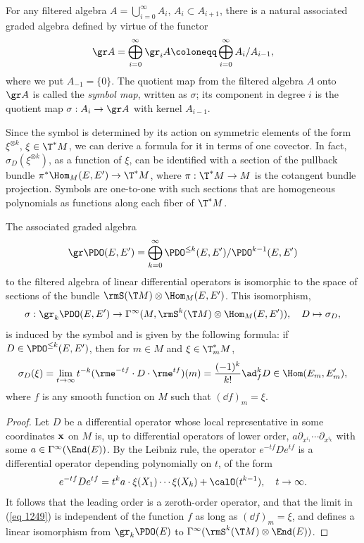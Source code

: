 \begin{defn}
    For any filtered algebra $A=\bigcup_{i=0}^\infty A_i$, $A_i\subset A_{i+1}$, there is a natural associated graded algebra defined by virtue of the functor 
    \[\gr A= \bigoplus_{i=0}^\infty \gr_i A\coloneqq \bigoplus_{i=0}^\infty A_i\slash A_{i-1},\]
    where we put $A_{-1}=\{0\}$. The quotient map from the filtered algebra $A$ onto $\gr A$ is called the \emph{symbol map}, written as $\sigma$; its component in degree $i$ is the quotient map $\sigma:A_i\to \gr A$ with kernel $A_{i-1}$.
\end{defn}

Since the symbol is determined by its action on symmetric elements of the form $\xi^{\otimes k}$, $\xi\in \T^\ast M$, we can derive a formula for it in terms of one covector. In fact, $\sigma_D(\xi^{\otimes k})$, as a function of $\xi$, can be identified with a section of the pullback bundle $\pi^\ast \Hom_M(E,E')\to \T^\ast M$, where $\pi:\T^\ast M\to M$ is the cotangent bundle projection. Symbols are one-to-one with such sections that are homogeneous polynomials as functions along each fiber of $\T^\ast M$.

\begin{prop}
    The associated graded algebra 
    \[\gr\PDO(E,E')=\bigoplus_{k=0}^{\infty}\PDO^{\leq k}(E,E')\slash\PDO^{k-1}(E,E')\]
    to the filtered algebra of linear differential operators is isomorphic to the space of sections of the bundle $\rmS(\T M)\otimes\Hom_M(E,E')$. This isomorphism,
    \[\sigma:\gr_k\PDO(E,E')\to \Gamma^\infty(M,\rmS^k(\T M)\otimes\Hom_M(E,E')),\quad D\mapsto \sigma_D,\] 
    is induced by the symbol and is given by the following formula: if $D\in\PDO^{\leq k}(E,E')$, then for $m\in M$ and $\xi\in \T^\ast_m M$,
    \[\sigma_D(\xi)=\lim_{t\to\infty}t^{-k}(\rme^{-tf}\cdot D\cdot \rme^{tf})(m)=\frac{(-1)^k}{k!}\ad_f^k D\in\Hom(E_m,E_m'),\label{eq 1249}\]
    where $f$ is any smooth function on $M$ such that $(\dd f)_m=\xi$.
\end{prop}
\begin{proof}
    Let $D$ be a differential operator whose local representative in some coordinates $\bf{x}$ on $M$ is, up to differential operators of lower order, $a \partial_{x^{i_1}}\cdots\partial_{x^{i_k}}$ with some $a\in\Gamma^\infty(\End(E))$. By the Leibniz rule, the operator $e^{-tf}De^{tf}$ is a differential operator depending polynomially on $t$, of the form 
    \[e^{-tf}De^{tf}=t^k a\cdot \xi(X_1)\cdots \xi(X_k)+\calO(t^{k-1}),\quad t\to\infty.\]
    It follows that the leading order is a zeroth-order operator, and that the limit in (\ref{eq 1249}) is independent of the function $f$ as long as $(\dd f)_m=\xi$, and defines a linear isomorphism from $\gr_k\PDO(E)$ to $\Gamma^\infty(\rmS^k(\T M)\otimes \End(E))$.
\end{proof}


